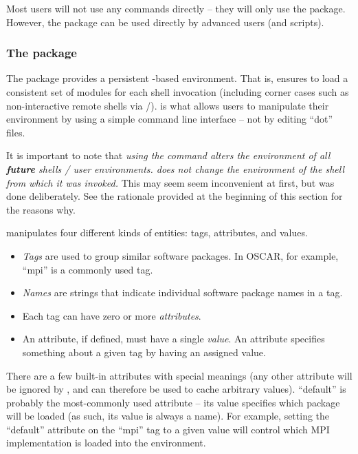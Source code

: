 Most users will not use any  commands directly -- they
will only use the  package.  However, the
 package can be used directly by advanced users (and
scripts).


\subsubsection{The  package}

The  package provides a persistent
-based environment.  That is,  ensures
to load a consistent set of modules for each shell invocation
(including corner cases such as non-interactive remote shells via
/).   is what allows users to
manipulate their environment by using a simple command line interface
-- not by editing ``dot'' files.

It is important to note that {\em using the  command
  alters the environment of all {\bf future} shells / user
  environments.   does not change the environment of the
  shell from which it was invoked.}  This may seem seem inconvenient
at first, but was done deliberately.  See the rationale provided at
the beginning of this section for the reasons why.

 manipulates four different kinds of entities: tags,
attributes, and values.  

\begin{itemize}
\item {\em Tags} are used to group similar software packages.  In
  OSCAR, for example, ``mpi'' is a commonly used tag.
  
\item {\em Names} are strings that indicate individual software
  package names in a tag.

\item Each tag can have zero or more {\em attributes}.  
  
\item An attribute, if defined, must have a single {\em value}.  An
  attribute specifies something about a given tag by having an
  assigned value.
\end{itemize}

There are a few built-in attributes with special meanings (any other
attribute will be ignored by , and can therefore be
used to cache arbitrary values).  ``default'' is probably the
most-commonly used attribute -- its value specifies which package will
be loaded (as such, its value is always a name).  For example, setting
the ``default'' attribute on the ``mpi'' tag to a given value will
control which MPI implementation is loaded into the environment.


